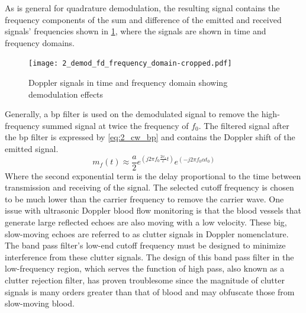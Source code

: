 As is general for quadrature demodulation, the resulting signal contains the frequency components of the sum and difference of the emitted and received signals' frequencies shown in \cref{fig:2_demod_fd_frequency_domain}, where the signals are shown in time and frequency domains.

\begin{figure}[htbp]
	\centering
	\texttt{[image: 2\_demod\_fd\_frequency\_domain-cropped.pdf]}
	\caption[Doppler signals in time and frequency domain showing demodulation effects]{Doppler signals in time and frequency domain showing demodulation effects \cite{ShungUltrasound_Book}}
	\label{fig:2_demod_fd_frequency_domain}
\end{figure}

Generally, a \gls{bp} filter is used on the demodulated signal to remove the high-frequency summed signal at twice the frequency of $f_{0}$. The filtered signal after the \gls{bp} filter is expressed by \cref{eq:2_cw_bp} and contains the Doppler shift of the emitted signal.
\begin{equation} \label{eq:2_cw_bp}
	m_{f}(t) \approx \frac{a}{2} e^{\left(j2\pi f_{0} \frac{2v_{z}}{c}t\right)} e^{\left( -j2\pi f_{0} \alpha t_{0} \right)}
\end{equation}
Where the second exponential term is the delay proportional to the time between transmission and receiving of the signal. The selected cutoff frequency is chosen to be much lower than the carrier frequency to remove the carrier wave. One issue with ultrasonic Doppler blood flow monitoring is that the blood vessels that generate large reflected echoes are also moving with a low velocity. These big, slow-moving echoes are referred to as clutter signals in Doppler nomenclature. The band pass filter's low-end cutoff frequency must be designed to minimize interference from these clutter signals. The design of this band pass filter in the low-frequency region, which serves the function of high pass, also known as a clutter rejection filter, has proven troublesome since the magnitude of clutter signals is many orders greater than that of blood and may obfuscate those from slow-moving blood.

